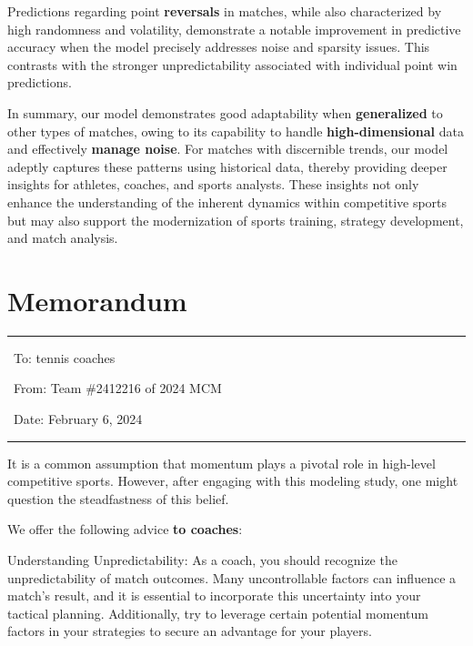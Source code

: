 \documentclass{mcmthesis}
\begin{document}
Predictions regarding point \textbf{reversals} in matches, while also characterized by high randomness and volatility, demonstrate a notable improvement in predictive accuracy when the model precisely addresses noise and sparsity issues. This contrasts with the stronger unpredictability associated with individual point win predictions.

In summary, our model demonstrates good adaptability when \textbf{generalized} to other types of matches, owing to its capability to handle \textbf{high-dimensional} data and effectively \textbf{manage noise}. For matches with discernible trends, our model adeptly captures these patterns using historical data, thereby providing deeper insights for athletes, coaches, and sports analysts. These insights not only enhance the understanding of the inherent dynamics within competitive sports but may also support the modernization of sports training, strategy development, and match analysis.

\newpage
\section{Memorandum}

\noindent\rule{\textwidth}{1pt}

\vspace{-0.2cm}

\noindent \ To: tennis coaches

\vspace{-0.2cm}

\noindent \ From: Team \#2412216 of 2024 MCM

\vspace{-0.2cm}

\noindent \ Date: February 6, 2024


\vspace{-0.4cm}

\noindent\rule{\textwidth}{1pt}

It is a common assumption that momentum plays a pivotal role in high-level competitive sports. However, after engaging with this modeling study, one might question the steadfastness of this belief.

We offer the following advice \textbf{to coaches}:

Understanding Unpredictability: As a coach, you should recognize the unpredictability of match outcomes. Many uncontrollable factors can influence a match's result, and it is essential to incorporate this uncertainty into your tactical planning. Additionally, try to leverage certain potential momentum factors in your strategies to secure an advantage for your players.
\end{document}
